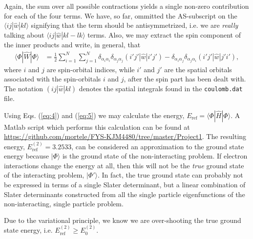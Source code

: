 \documentclass[a4paper]{article}
\begin{document}
 Again, the sum over all possible contractions yields a single non-zero contribution for each of the four terms. We have, so far, ommitted the AS-subscript on the $\langle i j | \hat{w} | k l\rangle$ signifying that the term should be antisymmetrized, i.e. we are \emph{really} talking about $\langle i j | \hat{w} | k l - l k\rangle$ terms. Also, we may extract the spin component of the inner products and write, in general, that 
 \begin{align}
 \langle \Phi | \hat{W} | \Phi \rangle &= \frac{1}{2}\sum_{i=1}^N \sum_{j=1}^N \delta_{\alpha_i\alpha_i}\delta_{\alpha_j\alpha_j}(i'j'|\hat{w}|i'j') - \delta_{\alpha_i\alpha_j}\delta_{\alpha_j\alpha_i}(i'j'|\hat{w}|j'i'), \label{eq:5}
 \end{align}
 where $i$ and $j$ are spin-orbital indices, while $i'$ and $j'$ are the spatial orbitals associated with the spin-orbitals $i$ and $j$, after the spin part has been dealt with. The notation $(ij|\hat{w}|kl)$ denotes the spatial integrals found in the \texttt{coulomb.dat} file. 

 Using Eqs. (\ref{eq:4}) and (\ref{eq:5}) we may calculate the energy, $E_\text{ref}=\langle \Phi| \hat{H} |\Phi\rangle$. A {\sc Matlab} script which performs this calculation can be found at \url{https://github.com/mortele/FYS-KJM4480/tree/master/Project1}. The resulting energy, $E_\text{ref}^{(2)}=3.2533$, can be considered an approximation to the ground state energy because $|\Phi\rangle$ is the ground state of the non-interacting problem. If electron interactions change the energy at all, then this will not be the \emph{true} ground state of the interacting problem, $|\Phi'\rangle$. In fact, the true ground state can probably not be expressed in terms of a single Slater determinant, but a linear combination of Slater determinants constructed from all the single particle eigenfunctions of the non-interacting, single particle problem.

 Due to the variational principle, we know we are over-shooting the true ground state energy, i.e. $E_\text{ref}^{(2)}\ge E_0^{(2)}$.
\end{document}
